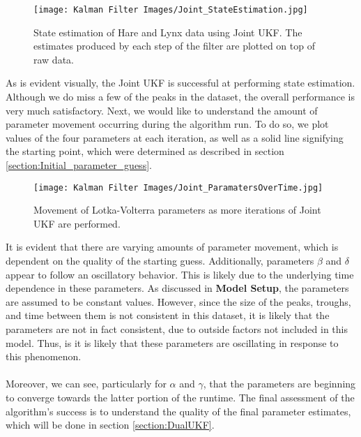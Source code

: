 \documentclass{article}
\begin{document}
\begin{figure}[H]
    \centering
    \texttt{[image: Kalman Filter Images/Joint\_StateEstimation.jpg]}
    \caption{State estimation of Hare and Lynx data using Joint UKF. The estimates produced by each step of the filter are plotted on top of raw data.}
    \label{fig:LV_Joint_StateEstimation}
\end{figure}

As is evident visually, the Joint UKF is successful at performing state estimation. Although we do miss a few of the peaks in the dataset, the overall performance is very much satisfactory. Next, we would like to understand the amount of parameter movement occurring during the algorithm run. To do so, we plot values of the four parameters at each iteration, as well as a solid line signifying the starting point, which were determined as described in section \ref{section:Initial_parameter_guess}.

\begin{figure}[H]
    \centering
    \texttt{[image: Kalman Filter Images/Joint\_ParamatersOverTime.jpg]}
    \caption{Movement of Lotka-Volterra parameters as more iterations of Joint UKF are performed.}
    \label{fig:LV_Joint_ParamMovement}
\end{figure}


It is evident that there are varying amounts of parameter movement, which is dependent on the quality of the starting guess. Additionally, parameters $\beta$ and $\delta$ appear to follow an oscillatory behavior. This is likely due to the underlying time dependence in these parameters. As discussed in \textbf{Model Setup}, the parameters are assumed to be constant values. However, since the size of the peaks, troughs, and time between them is not consistent in this dataset, it is likely that the parameters are not in fact consistent, due to outside factors not included in this model. Thus, is it is likely that these parameters are oscillating in response to this phenomenon.\\
\\

Moreover, we can see, particularly for $\alpha$ and $\gamma$, that the parameters are beginning to converge towards the latter portion of the runtime. The final assessment of the algorithm's success is to understand the quality of the final parameter estimates, which will be done in section \ref{section:DualUKF}.
\end{document}
